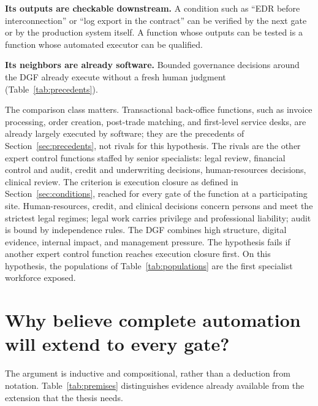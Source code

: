 \textbf{Its outputs are checkable downstream.} A condition such as ``EDR before interconnection'' or
``log export in the contract'' can be verified by the next gate or by the production system itself. A
function whose outputs can be tested is a function whose automated executor can be qualified.

\textbf{Its neighbors are already software.} Bounded governance decisions around the DGF already execute
without a fresh human judgment (Table~\ref{tab:precedents}).

The comparison class matters. Transactional back-office functions, such as invoice processing, order
creation, post-trade matching, and first-level service desks, are already largely executed by software;
they are the precedents of Section~\ref{sec:precedents}, not rivals for this hypothesis. The rivals are
the other expert control functions staffed by senior specialists: legal review, financial control and
audit, credit and underwriting decisions, human-resources decisions, clinical review. The criterion is
execution closure as defined in Section~\ref{sec:conditions}, reached for every gate of the function at
a participating site. Human-resources, credit, and clinical decisions concern persons and meet the
strictest legal regimes; legal work carries privilege and professional liability; audit is bound by
independence rules. The DGF combines high structure, digital evidence, internal impact, and management
pressure. The hypothesis fails if another expert control function reaches execution closure first. On
this hypothesis, the populations of Table~\ref{tab:populations} are the first specialist workforce
exposed.

\section{Why believe complete automation will extend to every gate?}
\label{sec:premises}

The argument is inductive and compositional, rather than a deduction from notation.
Table~\ref{tab:premises} distinguishes evidence already available from the extension that the thesis
needs.

